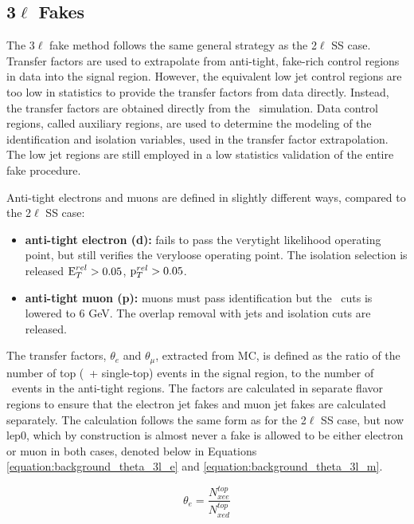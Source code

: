 



\subsection{3$\ell$ Fakes}

The 3$\ell$ fake method follows the same general strategy as the 2$\ell$ SS case. Transfer factors are used to extrapolate from anti-tight, fake-rich control regions in data  into the signal region.  However, the equivalent low jet control regions are too low in statistics to provide the transfer factors from data directly. Instead, the transfer factors are obtained directly from the \ttbar\ simulation. Data control regions, called auxiliary regions, are used to determine the modeling of the identification and isolation variables, used in the transfer factor extrapolation. The low jet regions are still employed in a low statistics validation of the entire fake procedure. 

Anti-tight electrons and muons are defined in slightly different ways, compared to the 2$\ell$ SS case:
\begin{itemize}
\item \textbf{ anti-tight electron (d):} fails to pass the {\textsc verytight} likelihood operating point, but still verifies the {\textsc veryloose} operating point. The isolation selection is released $\rm E_{T}^{rel}>0.05$,  $\rm p_{T}^{rel}>0.05$.

\item \textbf{ anti-tight muon (p):} muons must pass identification but the \pt\ cuts is lowered to 6 GeV. The overlap removal with jets and isolation cuts are released.
\end{itemize} 
The transfer factors, $\theta_e$ and $\theta_{\mu}$, extracted from MC, is defined as the ratio of the number of top (\ttbar\ + single-top) events in the signal region, to the number of \ttbar\ events in the anti-tight regions. The factors are calculated in separate flavor regions to ensure that the electron jet fakes and muon jet fakes are calculated separately. The calculation follows the same form as for the 2$\ell$ SS case, but now lep0, which by construction is almost never a fake is allowed to be either electron or muon in both cases, denoted below in Equations \ref{equation:background_theta_3l_e} and \ref{equation:background_theta_3l_m}.  

\begin{equation}
\theta_e = \frac{N^{top}_{xee}}{N^{top}_{xed}}
\label{equation:background_theta_3l_e}
\end{equation}

